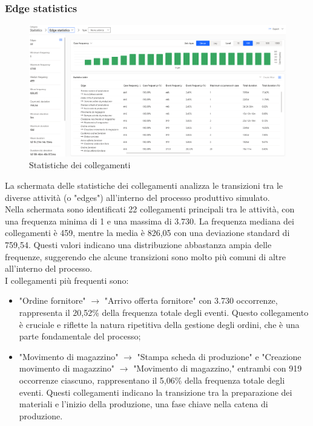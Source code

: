 \documentclass{article}
\begin{document}
\subsubsection{Edge statistics}
\begin{figure}[H]
    \centering
    \includegraphics[width=\textwidth]{imgMicrosoft/SecondaSimulazione/StatisticsEdgeStatisticsSimulazione2.png}
    \caption{Statistiche dei collegamenti}
    \label{fig:edge-statistics}
\end{figure}
La schermata delle statistiche dei collegamenti analizza le transizioni tra le diverse attività (o "edges") all'interno del processo produttivo simulato.\\
Nella schermata sono identificati 22 collegamenti principali tra le attività, con una frequenza minima di 1 e una massima di 3.730. La frequenza mediana dei collegamenti è 459, mentre la media è 826,05 con una deviazione standard di 759,54. Questi valori indicano una distribuzione abbastanza ampia delle frequenze, suggerendo che alcune transizioni sono molto più comuni di altre all'interno del processo.\\
I collegamenti più frequenti sono:
\begin{itemize}
    \item "Ordine fornitore" $\rightarrow$ "Arrivo offerta fornitore" con 3.730 occorrenze, rappresenta il 20,52\% della frequenza totale degli eventi. Questo collegamento è cruciale e riflette la natura ripetitiva della gestione degli ordini, che è una parte fondamentale del processo;
    \item "Movimento di magazzino" $\rightarrow$ "Stampa scheda di produzione" e "Creazione movimento di magazzino" $\rightarrow$ "Movimento di magazzino," entrambi con 919 occorrenze ciascuno, rappresentano il 5,06\% della frequenza totale degli eventi. Questi collegamenti indicano la transizione tra la preparazione dei materiali e l'inizio della produzione, una fase chiave nella catena di produzione.
\end{itemize}
\end{document}
